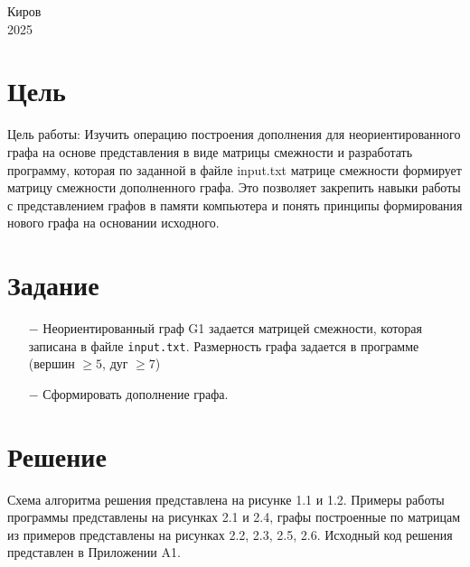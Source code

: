 \documentclass[oneside,a4paper,14pt]{extarticle}
\begin{document}
\begin{center}
	Киров\\
	2025
\end{center}

\newpage\thispagestyle{plain}

\section*{Цель}

Цель работы: Изучить операцию построения дополнения для неориентированного графа на основе представления в виде матрицы смежности и разработать программу, которая по заданной в файле input.txt матрице смежности формирует матрицу смежности дополненного графа. Это позволяет закрепить навыки работы с представлением графов в памяти компьютера и понять принципы формирования нового графа на основании исходного.

\section*{Задание}
\begin{itemize}
	\item[$-$] Неориентированный граф G1 задается матрицей смежности, которая записана в файле \texttt{input.txt}. Размерность графа задается в программе (вершин $\geq 5$, дуг $\geq 7$)
	\item[$-$] Сформировать дополнение графа.
\end{itemize}
\section*{Решение}

Схема алгоритма решения представлена на рисунке 1.1 и 1.2. Примеры работы программы представлены на рисунках 2.1 и 2.4, графы построенные по матрицам из примеров представлены на рисунках 2.2, 2.3, 2.5, 2.6. Исходный код решения представлен в Приложении A1.
\end{document}
